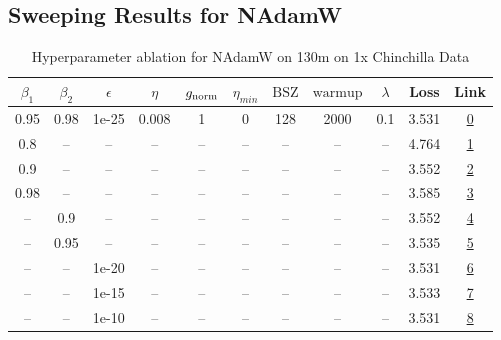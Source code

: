 \subsection{Sweeping Results for NAdamW}%
\begin{table}[H]
\centering
\caption{Hyperparameter ablation for NAdamW on 130m on 1x Chinchilla Data}
\label{tab:ablation_nadamw_130m_on_1x_chinchilla_data}
\begin{tabular}{ccccccccccc}
\toprule
$\beta_1$ & $\beta_2$ & $\epsilon$ & $\eta$ & $g_{\mathrm{norm}}$ & $\eta_{min}$ & $\mathrm{BSZ}$ & $\mathrm{warmup}$ & $\lambda$ & Loss & Link \\
\midrule
0.95 & 0.98 & 1e-25 & 0.008 & 1 & 0 & 128 & 2000 & 0.1 & 3.531 & \href{https://wandb.ai/marin-community/optimizer-scaling/runs/sweep-130m-2B-nadamw2de195lr0.008-wd0.1-minlr0-warmup2000-b10.95-437e7c}{0} \\
\midrule
0.8 & -- & -- & -- & -- & -- & -- & -- & -- & 4.764 & \href{https://wandb.ai/marin-community/optimizer-scaling/runs/sweep-130m-2B-nadamw434949lr0.008-wd0.1-minlr0-warmup2000-b10.8--08f271}{1} \\
0.9 & -- & -- & -- & -- & -- & -- & -- & -- & 3.552 & \href{https://wandb.ai/marin-community/optimizer-scaling/runs/sweep-130m-2B-nadamwd53b3flr0.008-wd0.1-minlr0-warmup2000-b10.9--c3b202}{2} \\
0.98 & -- & -- & -- & -- & -- & -- & -- & -- & 3.585 & \href{https://wandb.ai/marin-community/optimizer-scaling/runs/sweep-130m-2B-nadamw2aa7d8lr0.008-wd0.1-minlr0-warmup2000-b10.98-d13a84}{3} \\
-- & 0.9 & -- & -- & -- & -- & -- & -- & -- & 3.552 & \href{https://wandb.ai/marin-community/optimizer-scaling/runs/sweep-130m-2B-nadamw8079eflr0.008-wd0.1-minlr0-warmup2000-b10.95-da3b17}{4} \\
-- & 0.95 & -- & -- & -- & -- & -- & -- & -- & 3.535 & \href{https://wandb.ai/marin-community/optimizer-scaling/runs/sweep-130m-2B-nadamwf5b595lr0.008-wd0.1-minlr0-warmup2000-b10.95-538632}{5} \\
-- & -- & 1e-20 & -- & -- & -- & -- & -- & -- & 3.531 & \href{https://wandb.ai/marin-community/optimizer-scaling/runs/sweep-130m-2B-nadamwf2ca74lr0.008-wd0.1-minlr0-warmup2000-b10.95-d57343}{6} \\
-- & -- & 1e-15 & -- & -- & -- & -- & -- & -- & 3.533 & \href{https://wandb.ai/marin-community/optimizer-scaling/runs/sweep-130m-2B-nadamwd2c0fblr0.008-wd0.1-minlr0-warmup2000-b10.95-142d0c}{7} \\
-- & -- & 1e-10 & -- & -- & -- & -- & -- & -- & 3.531 & \href{https://wandb.ai/marin-community/optimizer-scaling/runs/sweep-130m-2B-nadamw96aba0lr0.008-wd0.1-minlr0-warmup2000-b10.95-2ac247}{8} \\

\end{tabular}
\end{table}
